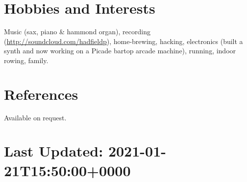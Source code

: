 \documentclass[line]{resume}
\begin{document}
\begin{resume}
    \section{\mysidestyle Hobbies and Interests}

    Music (sax, piano \& hammond organ), recording (\url{http://soundcloud.com/hadfieldp}), home-brewing, hacking,
    electronics (built a synth and now working on a Picade bartop arcade machine), running, indoor rowing, family.

    \section{\mysidestyle References}

    Available on request.

    \section{\mysidestyle Last Updated: 2021-01-21T15:50:00+0000}

\end{resume}
\end{document}
